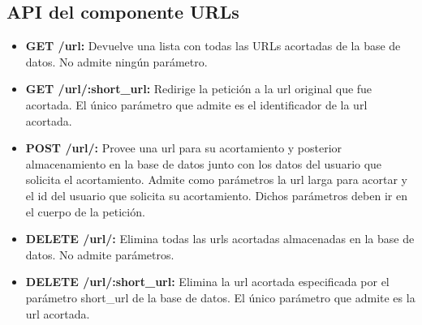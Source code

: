 \documentclass[a4paper]{article}
\begin{document}
	\subsection{API del componente URLs}
	\begin{itemize}
		\item \textbf{GET /url:} Devuelve una lista con todas las URLs acortadas de la base de datos. No admite ningún parámetro.
		\item \textbf{GET /url/:short\_url:} Redirige la petición a la url original que fue acortada. El único parámetro que admite es el identificador de la url acortada.
		\item \textbf{POST /url/:} Provee una url para su acortamiento y posterior almacenamiento en la base de datos junto con los datos del usuario que solicita el acortamiento. Admite como parámetros la url larga para acortar y el id del usuario que solicita su acortamiento. Dichos parámetros deben ir en el cuerpo de la petición.
		\item \textbf{DELETE /url/:} Elimina todas las urls acortadas almacenadas en la base de datos. No admite parámetros.
		\item \textbf{DELETE /url/:short\_url:} Elimina la url acortada especificada por el parámetro short\_url de la base de datos. El único parámetro que admite es la url acortada.
	\end{itemize}
	
\end{document}

